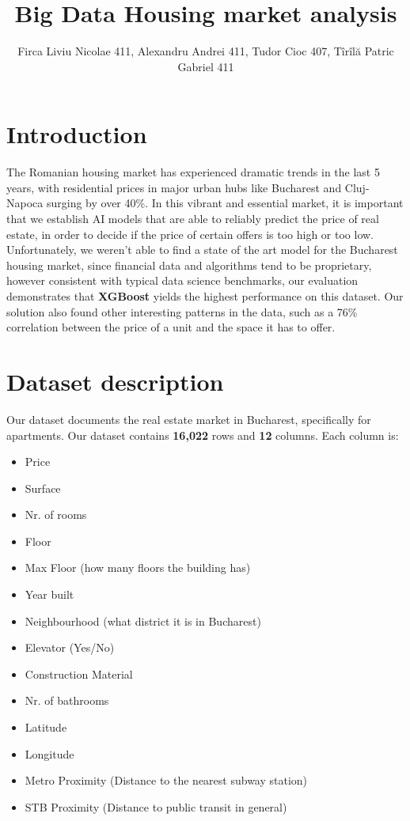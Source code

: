 \documentclass{article}
\title{Big Data Housing market analysis}
\author{Firca Liviu Nicolae 411, Alexandru Andrei 411, Tudor Cioc 407, Tîrîlă Patric Gabriel 411}
\begin{document}
\maketitle



\section{Introduction}
The Romanian housing market has experienced dramatic trends in the last 5 years, with residential prices in major urban hubs like Bucharest and Cluj-Napoca surging by over 40\%. In this vibrant and essential market, it is important that we establish AI models that are able to reliably predict the price of real estate, in order to decide if the price of certain offers is too high or too low.
Unfortunately, we weren't able to find a state of the art model for the Bucharest housing market, since financial data and algorithms tend to be proprietary, however consistent with typical data science benchmarks, our evaluation demonstrates that \textbf{XGBoost} yields the highest performance on this dataset. Our solution also found other interesting patterns in the data, such as a 76\% correlation between the price of a unit and the space it has to offer.

\section{Dataset description}
Our dataset documents the real estate market in Bucharest, specifically for apartments.
Our dataset contains \textbf{16{,}022} rows and \textbf{12} columns. Each column is:
\begin{itemize}
    \bfseries
    \item Price
    \item Surface 
    \item Nr. of rooms
    \item Floor 
    \item Max Floor (how many floors the building has)
    \item Year built
    \item Neighbourhood (what district it is in Bucharest)
    \item Elevator (Yes/No)
    \item Construction Material 
    \item Nr. of bathrooms
    \item Latitude 
    \item Longitude 
    \item Metro Proximity (Distance to the nearest subway station)
    \item STB Proximity (Distance to public transit in general)
\end{itemize}
\end{document}
